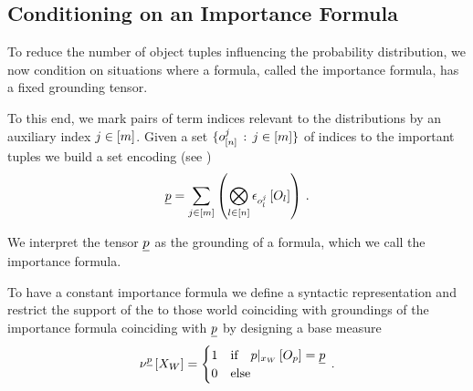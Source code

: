 \subsection{Conditioning on an Importance Formula}



To reduce the number of object tuples influencing the probability distribution, we now condition \HybridFOLNetworks{} on situations where a formula, called the importance formula, has a fixed grounding tensor.

To this end, we mark pairs of term indices relevant to the distributions by an auxiliary index $j\in[m]$.
Given a set $\{o_{[n]}^{j} \,:\, j\in[m] \}$ of indices to the important tuples we build a set encoding (see )
\begin{align*}
    \underline{p} = \sum_{j\in[m]} \left(
    \bigotimes_{l\in[n]} \epsilon_{o_{l}^{j}}\left[O_{l}\right]
    \right) \, .
\end{align*}

We interpret the tensor $\underline{p}$ as the grounding of a formula, which we call the importance formula.

To have a constant importance formula we define a syntactic representation and restrict the support of the \HybridFOLNetwork{} to those world coinciding with groundings of the importance formula coinciding with $\underline{p}$ by designing a base measure
\begin{align*}
    \nu^{\underline{p}}\left[X_{W}\right]
    = \begin{cases}
          1 & \text{if}\quad {p}|_{x_{W}} \left[O_{p}\right] = \underline{p} \\
          0 & \text{else}
    \end{cases} \, .
\end{align*}

